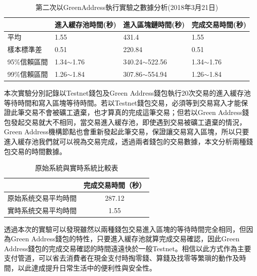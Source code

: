 			\begin{table}[htbp]
				\centering
				\caption{第二次以GreenAddress執行實驗之數據分析(2018年3月21日)}
				\label{2green-1}
				\begin{tabular}{|l|l|l|l|}
				\hline
				 & 進入緩存池時間(秒) & 進入區塊鏈時間(秒) & 完成交易時間(秒) \\ \hline
				平均 & 1.55 & 431.4 & 1.55 \\ \hline
				樣本標準差 & 0.51 & 220.84 & 0.51 \\ \hline
				95\%信賴區間 & 1.34$\sim$1.76 & 340.24$\sim$522.56 & 1.34$\sim$1.76 \\ \hline
				99\%信賴區間 & 1.26$\sim$1.84 & 307.86$\sim$554.94 & 1.26$\sim$1.84 \\ \hline
				\end{tabular}
				\end{table}

				

				
				



	本次實驗分別記錄以Testnet錢包及Green Address錢包執行20次交易的進入緩存池等待時間和寫入區塊等待時間。若以Testnet錢包交易，必須等到交易寫入才能保證此筆交易不會被礦工遺棄，也才算真的完成這筆交易；但若以Green Address錢包發起交易就大不相同，當交易進入緩存池，即使遇到交易被礦工遺棄的情況，Green Address機構節點也會重新發起此筆交易，保證讓交易寫入區塊，所以只要進入緩存池我們就可以視為交易完成，透過兩者錢包的交易數據，本文分析兩種錢包交易的時間數據。

	\begin{table}[htbp]
	\centering
	\caption{原始系統與實時系統比較表}
	\label{generalvsga}
	\begin{tabular}{|c|c|}
	\hline
	 & 完成交易時間（秒） \\ \hline
	原始系统交易平均時間 & 287.12 \\ \hline
	實時系统交易平均時間 & 1.55 \\ \hline
	\end{tabular}
	\end{table}

	透過本次的實驗可以發現雖然以兩種錢包交易進入區塊的等待時間完全相同，但因為Green Address錢包的特性，只要進入緩存池就算完成交易確認，因此Green Address錢包的完成交易確認的時間遠遠快於一般Testnet。相信以此⽅式作為主要⽀付管道，可以省去消費者在現金⽀付時掏零錢、算錢及找零等繁瑣的動作及時間，以此達成提升⽇常⽣活中的便利性與安全性。



		